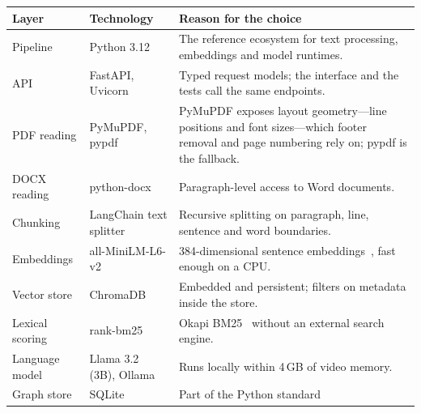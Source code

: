 \begin{table}[ht]
\centering
\small
\begin{tabularx}{\textwidth}{@{}llX@{}}
\toprule
Layer & Technology & Reason for the choice \\
\midrule
Pipeline        & Python 3.12              & The reference ecosystem for text
                                             processing, embeddings and model
                                             runtimes. \\
API             & FastAPI, Uvicorn         & Typed request models; the
                                             interface and the tests call the
                                             same endpoints. \\
PDF reading     & PyMuPDF, pypdf           & PyMuPDF exposes layout
                                             geometry---line positions and
                                             font sizes---which footer removal
                                             and page numbering rely on; pypdf
                                             is the fallback. \\
DOCX reading    & python-docx              & Paragraph-level access to Word
                                             documents. \\
Chunking        & LangChain text splitter  & Recursive splitting on paragraph,
                                             line, sentence and word
                                             boundaries. \\
Embeddings      & all-MiniLM-L6-v2         & 384-dimensional sentence
                                             embeddings~\cite{reimers2019sbert,wang2020minilm},
                                             fast enough on a CPU. \\
Vector store    & ChromaDB                 & Embedded and persistent; filters
                                             on metadata inside the store. \\
Lexical scoring & rank-bm25                & Okapi
                                             BM25~\cite{robertson2009bm25}
                                             without an external search
                                             engine. \\
Language model  & Llama 3.2 (3B), Ollama   & Runs locally within 4\,GB of video
                                             memory. \\
Graph store     & SQLite                   & Part of the Python standard

\end{tabularx}
\end{table}
